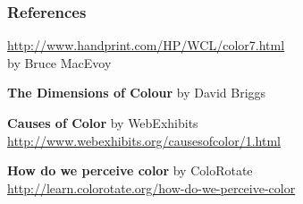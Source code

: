 \documentclass[12pt]{beamer}\usepackage[]{graphicx}\usepackage[]{color}
\begin{document}

\begin{frame}
\frametitle{References}

\bbi
  \item \url{http://www.handprint.com/HP/WCL/color7.html} \\
  by Bruce MacEvoy
  \item \textbf{The Dimensions of Colour} by David Briggs
  \item \textbf{Causes of Color} by WebExhibits \\
  {\scriptsize \url{http://www.webexhibits.org/causesofcolor/1.html}}
  \item \textbf{How do we perceive color} by ColoRotate \\
  {\tiny \url{http://learn.colorotate.org/how-do-we-perceive-color}}
\ei

\end{frame}

\end{document}
